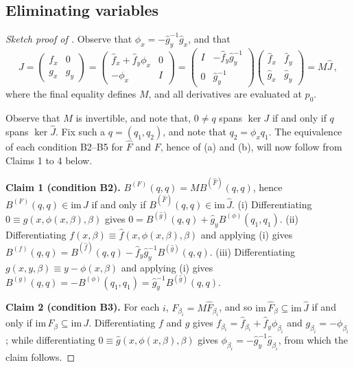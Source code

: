 \documentclass[11pt]{amsart}
\newcommand{\wF}{\widehat{F}}
\newcommand{\wJ}{\hat{J}}
\theoremstyle{definition}
\begin{document}
\subsection{Eliminating variables}


\begin{proof}[Sketch proof of ]
Observe that $\phi_x = -\hat{g}_y^{-1}\hat{g}_x$, and that
\[
J = \left(\begin{array}{cc}f_x&0\\g_x&g_y\end{array}\right) = \left(\begin{array}{cc}\hat{f}_x + \hat{f}_y\phi_x&0\\-\phi_x&I\end{array}\right) = \left(\begin{array}{cc}I & -\hat{f}_y\hat{g}_y^{-1}\\0 & \hat{g}_y^{-1}\end{array}\right)\left(\begin{array}{cc}\hat{f}_x&\hat{f}_y\\\hat{g}_x&\hat{g}_y \end{array}\right) = M\wJ\,,
\]
where the final equality defines $M$, and all derivatives are evaluated at $p_0$. 

Observe that $M$ is invertible, and note that, $0 \neq q$ spans $\ker J$ if and only if $q$ spans $\ker\wJ$. Fix such a $q = (q_1, q_2)$, and note that $q_2 = \phi_x q_1$. The equivalence of each condition B2--B5 for $\wF$ and $F$, hence of (a) and (b), will now follow from Claims 1 to 4 below. 

{\bf Claim 1 (condition B2).} $B^{(F)}(q,q) = MB^{(\wF)}(q,q)$, hence $B^{(F)}(q,q) \in \mathrm{im}\,J$ if and only if $B^{(\wF)}(q,q) \in \mathrm{im}\,\wJ$. (i) Differentiating $0 \equiv \hat{g}(x,\phi(x,\beta),\beta)$ gives $0 = B^{(\hat{g})}(q,q) + \hat{g}_y B^{(\phi)}(q_1,q_1)$. (ii) Differentiating $f(x,\beta) \equiv \hat{f}(x,\phi(x,\beta),\beta)$ and applying (i) gives $B^{(f)}(q,q) = B^{(\hat{f})}(q,q) - \hat{f}_y\hat{g}_y^{-1}B^{(\hat{g})}(q,q)$. (iii) Differentiating $g(x,y,\beta) \equiv y - \phi(x,\beta)$ and applying (i) gives $B^{(g)}(q,q) = -B^{(\phi)}(q_1,q_1) = \hat{g}_y^{-1} B^{(\hat{g})}(q,q)$. 

{\bf Claim 2 (condition B3).} For each $i$, $F_{\beta_i} = M\wF_{\beta_i}$, and so $\mathrm{im}\,\wF_\beta \subseteq \mathrm{im}\,\wJ$ if and only if $\mathrm{im}\,F_\beta \subseteq \mathrm{im}\,J$. Differentiating $f$ and $g$ gives $f_{\beta_i} = \hat{f}_{\beta_i} + \hat{f}_y\phi_{\beta_i}$ and $g_{\beta_i} = -\phi_{\beta_i}$; while differentiating $0 \equiv \hat{g}(x,\phi(x,\beta),\beta)$ gives $\phi_{\beta_i}=-\hat{g}_y^{-1}\hat{g}_{\beta_i}$, from which the claim follows. 


\end{proof}
\end{document}
